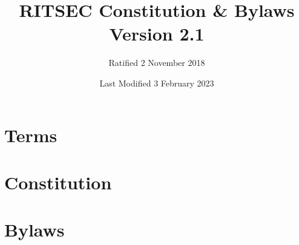 \documentclass{constitution}
\title{RITSEC Constitution \& Bylaws\\ Version 2.1}
\author{Ratified 2 November 2018}
\date{Last Modified 3 February 2023}
\begin{document}
\maketitle
\newpage

\part{Terms}



\newpage

\part{Constitution}












\newpage


\part{Bylaws}




\end{document}
